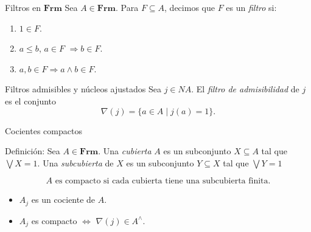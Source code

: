 \documentclass[compress,12pt]{beamer}
\begin{document}
\begin{frame}{Filtros en $\mathbf{Frm}$}
    Sea $A\in \mathbf{Frm}$. Para $F\subseteq A$, decimos que $F$ es un \emph{filtro} si:
		\begin{enumerate}
			\item $1\in F$.
			\item $a\leq b$, $a\in  F$ $\Rightarrow b \in F$.
			\item $a, b \in F \Rightarrow  a \wedge b \in F$.
		\end{enumerate}
\end{frame}

\begin{frame}{Filtros admisibles y núcleos ajustados}
    Sea $j\in NA$. El \emph{filtro de admisibilidad} de $j$ es el conjunto
    \[
    \nabla(j)=\{a\in A\mid j(a)=1\}.
    \]
\end{frame}

\begin{frame}{Cocientes compactos}
\begin{block}{Definición:}
Sea $A\in \mathbf{Frm}$. Una \emph{cubierta} $A$ es un subconjunto $X\subseteq A$ tal que $\bigvee X=1$. Una \emph{subcubierta} de $X$ es un subconjunto $Y\subseteq X$ tal que $\bigvee Y=1$
\end{block}
\[ 
A \mbox{ es compacto si cada cubierta tiene una subcubierta finita.}
\]

\begin{itemize}
    \item<3-> $A_j$ es un cociente de $A$.
    \item<4-> $A_j$ es compacto $\Leftrightarrow$ $\nabla(j)\in A^\wedge$.
\end{itemize}
\end{frame}
\end{document}
